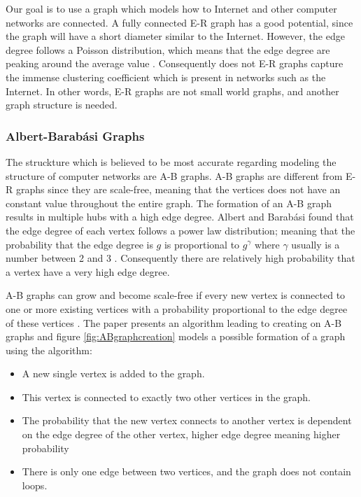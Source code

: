 Our goal is to use a graph which models how to Internet and other computer networks are connected. A fully connected E-R graph has a good potential, since the graph will have a short diameter similar to the Internet. However, the edge degree follows a Poisson distribution, which means that the edge degree are peaking around the average value \cite{audestad}. Consequently does not E-R graphs capture the immense clustering coefficient which is present in networks such as the Internet. In other words, E-R graphs are not small world graphs, and another graph structure is needed.



\subsubsection{\label{ABgraph}Albert-Barabási Graphs}
The struckture which is believed to be most accurate regarding modeling the structure of computer networks are A-B graphs. A-B graphs are different from E-R graphs since they are scale-free, meaning that the vertices does not have an constant value throughout the entire graph. The formation of an A-B graph results in multiple hubs with a high edge degree. Albert and Barabási found that the edge degree of each vertex follows a power law distribution; meaning that the probability that the edge degree is $g$ is proportional to $g^{\gamma}$
where $\gamma$ usually is a number between 2 and 3 \cite{audestad}. Consequently there are relatively high probability that a vertex have a very high edge degree. 

A-B graphs can grow and become scale-free if every new vertex is connected to one or more existing vertices with a probability proportional to the edge degree of these vertices \cite{audestad}. The paper \cite{audestad} presents an algorithm leading to creating on A-B graphs and figure \ref{fig:ABgraphcreation} models a possible formation of a graph using the algorithm:


\begin{itemize}
\item A new single vertex is added to the graph.
\item This vertex is connected to exactly two other vertices in the graph.
\item The probability that the new vertex connects to another vertex is dependent on the edge degree of the other vertex, higher edge degree meaning higher probability
\item There is only one edge between two vertices, and the graph does not contain loops.
\end{itemize}


